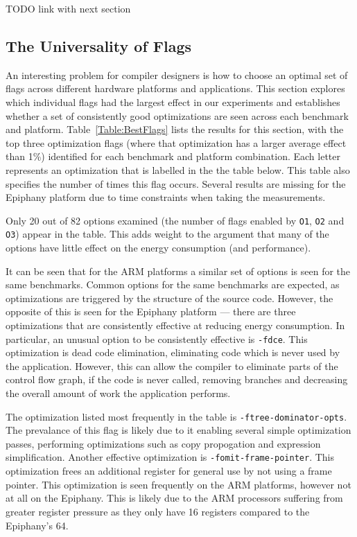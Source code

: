 \documentclass[twocolumn]{article}
\begin{document}
TODO link with next section


\subsection{The Universality of Flags}

An interesting problem for compiler designers is how to choose an optimal set of flags across different hardware platforms and applications. This section explores which individual flags had the largest effect in our experiments and establishes whether a set of consistently good optimizations are seen across each benchmark and platform. Table~\ref{Table:BestFlags} lists the results for this section, with the top three optimization flags (where that optimization has a larger average effect than 1\%) identified for each benchmark and platform combination.  Each letter represents an optimization that is labelled in the the table below. This table also specifies the number of times this flag occurs. Several results are missing for the Epiphany platform due to time constraints when taking the measurements.

Only 20 out of 82 options examined (the number of flags enabled by \texttt{O1}, \texttt{O2} and \texttt{O3}) appear in the table. This adds weight to the argument that many of the options have little effect on the energy consumption (and performance).

It can be seen that for the ARM platforms a similar set of options is seen for the same benchmarks. Common options for the same benchmarks are expected, as optimizations are triggered by the structure of the source code. However, the opposite of this is seen for the Epiphany platform --- there are three optimizations that are consistently effective at reducing energy consumption. In particular, an unusual option to be consistently effective is \texttt{-fdce}. This optimization is dead code elimination, eliminating code which is never used by the application. However, this can allow the compiler to eliminate parts of the control flow graph, if the code is never called, removing branches and decreasing the overall amount of work the application performs.

The optimization listed most frequently in the table is \texttt{-ftree-dominator-opts}. The prevalance of this flag is likely due to it enabling several simple optimization passes, performing optimizations such as copy propogation and expression simplification. Another effective optimization is \texttt{-fomit-frame-pointer}. This optimization frees an additional register for general use by not using a frame pointer. This optimization is seen frequently on the ARM platforms, however not at all on the Epiphany. This is likely due to the ARM processors suffering from greater register pressure as they only have 16 registers compared to the Epiphany's 64.
\end{document}
